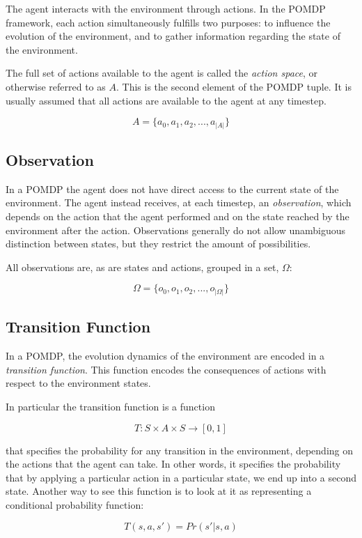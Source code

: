 The agent interacts with the environment through actions. In the POMDP framework, each action
simultaneously fulfills two purposes: to influence the evolution of the environment, and to gather
information regarding the state of the environment.

The full set of actions available to the agent is called the \textit{action space}, or otherwise
referred to as $A$. This is the second element of the POMDP tuple. It is usually assumed that all
actions are available to the agent at any timestep.

\[ A = \{ a_0, a_1, a_2, ..., a_{|A|} \} \]

\subsection{Observation}

In a POMDP the agent does not have direct access to the current state of the environment. The agent
instead receives, at each timestep, an \textit{observation}, which depends on the action that the
agent performed and on the state reached by the environment after the action. Observations generally
do not allow unambiguous distinction between states, but they restrict the amount of possibilities.

All observations are, as are states and actions, grouped in a set, $\Omega$:

\[ \Omega = \{ o_0, o_1, o_2, ..., o_{|\Omega|} \} \]

\subsection{Transition Function}

In a POMDP, the evolution dynamics of the environment are encoded in a \textit{transition function}.
This function encodes the consequences of actions with respect to the environment states.

In particular the transition function is a function

\[ T: S\times A \times S \rightarrow [0,1] \]

that specifies the probability for any transition in the environment, depending on the actions that
the agent can take. In other words, it specifies the probability that by applying a particular
action in a particular state, we end up into a second state. Another way to see this
function is to look at it as representing a conditional probability function:

\[ T(s, a, s') = Pr(s' | s, a) \]

